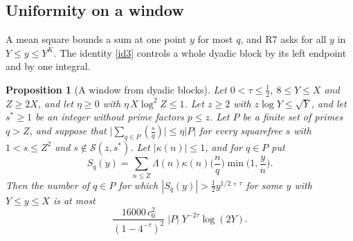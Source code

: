 \documentclass[11pt,letterpaper]{article}
\newtheorem{proposition}[theorem]{Proposition}
\numberwithin{equation}{section}
\begin{document}
\subsection{Uniformity on a window}

A mean square bounds a sum at one point $y$ for most $q$, and R7 asks for all $y$ in $Y\le y\le Y^K$. The identity \eqref{id3} controls a whole dyadic block by its left endpoint and by one integral.

\begin{proposition}[A window from dyadic blocks]\label{window}
Let $0<\tau\le\tfrac12$, $8\le Y\le X$ and $Z\ge2X$, and let $\eta\ge0$ with $\eta\,X\log^2Z\le1$. Let $z\ge2$ with $z\log Y\le\sqrt Y$, and let $s^\ast\ge1$ be an integer without prime factors $p\le z$. Let $P$ be a finite set of primes $q>Z$, and suppose that $\big|\sum_{q\in P}(\tfrac sq)\big|\le\eta|P|$ for every squarefree $s$ with $1<s\le Z^2$ and $s\notin\mathcal S(z,s^\ast)$. Let $|\kappa(n)|\le1$, and for $q\in P$ put
\[
S_q(y)=\sum_{n\le Z}\Lambda(n)\kappa(n)\Big(\frac nq\Big)\min\Big(1,\frac yn\Big).
\]
Then the number of $q\in P$ for which $|S_q(y)|>\tfrac12y^{1/2+\tau}$ for some $y$ with $Y\le y\le X$ is at most
\[
\frac{16000\,c_0^2}{(1-4^{-\tau})^2}\;|P|\;Y^{-2\tau}\log(2Y).
\]
\end{proposition}
\end{document}
